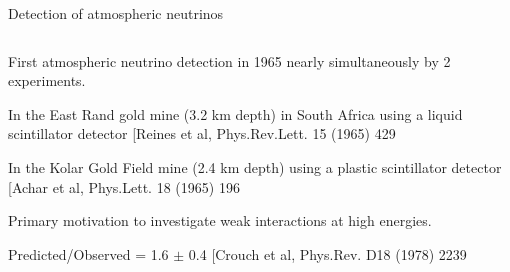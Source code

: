 \begin{frame}[t]{Detection of atmospheric neutrinos}

\begin{columns}
  \begin{column}{0.38\textwidth}
       \begin{itemize}
          {\scriptsize
            \item First atmospheric neutrino detection in 1965 nearly
              simultaneously by 2 experiments.
            \item In the East Rand gold mine (3.2 km depth) in South
                      Africa using a liquid scintillator detector
                      {\scriptsize \color{blue} [Reines et al, Phys.Rev.Lett. 15 (1965) 429}
            \item In the Kolar
                      Gold Field mine (2.4 km depth) using a plastic
                      scintillator detector
                      {\scriptsize \color{blue} [Achar et al, Phys.Lett. 18
                        (1965) 196}\\
            \item Primary motivation to investigate weak interactions
                      at high energies.
            \item Predicted/Observed = 1.6 $\pm$ 0.4
                      {\scriptsize \color{blue} [Crouch et al, Phys.Rev. D18
                        (1978) 2239}\\

}
\end{itemize}
\end{column}
\end{columns}
\end{frame}
